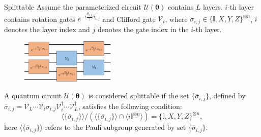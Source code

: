 \documentclass[10pt]{beamer}
\begin{document}
\begin{CJK}{UTF8}{gbsn}

\begin{frame}[fragile]{Splittable}
 Assume the parameterized circuit $\mathcal{U}(\bm{\theta})$ contains $L$ layers. $i$-th layer contains rotation gates $e^{-i\frac{\theta_{i,j}}{2}\sigma_{i,j}}$ and Clifford gate $\mathcal{V}_i$, where $\sigma_{i,j}\in \{\mathbb{I},X,Y,Z\}^{\otimes n}$, $i$ denotes the layer index and $j$ denotes the gate index in the $i$-th layer.

  \begin{figure}
    \centering
    \includegraphics[width=0.4\textwidth]{fig/split.png}
  \end{figure}

  \begin{mdframed}
  \begin{definition}
 A quantum circuit $\mathcal{U}(\bm{\theta})$ is considered splittable if the set $\{\overline{\sigma}_{i,j}\}$, defined by $\overline{\sigma}_{i,j}= \mathcal{V}_{L} \cdots \mathcal{V}_{i} \sigma_{i,j} \mathcal{V}_{i}^\dagger \cdots \mathcal{V}_{L}^\dagger$, satisfies the following condition:
    \begin{equation}\label{eq:generate}
      \langle \{\overline{\sigma}_{i,j}\}\rangle/\left(\langle \{\overline{\sigma}_{i,j}\}\rangle\cap\langle i\mathbb{I}^{\otimes n}\rangle\right) = \{\mathbb{I},X,Y,Z\}^{\otimes n},
    \end{equation}
 here $\langle \{\overline{\sigma}_{i,j}\} \rangle$ refers to the Pauli subgroup generated by set $\{\overline{\sigma}_{i,j}\}$.
  \end{definition}
  \end{mdframed}
\end{frame}
\end{CJK}
\end{document}
